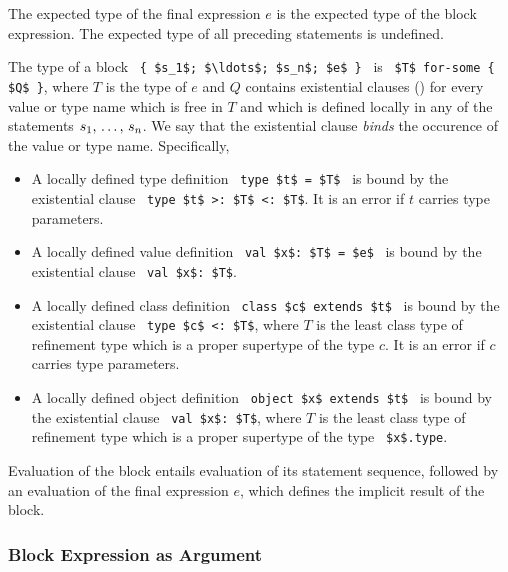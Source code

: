 The expected type of the final expression $e$ is the expected type of the block expression. The expected type of all preceding statements is undefined. 

The type of a block ~\lstinline!{ $s_1$; $\ldots$; $s_n$; $e$ }!~ is ~\lstinline!$T$ for-some { $Q$ }!, where $T$ is the type of $e$ and $Q$ contains existential clauses () for every value or type name which is free in $T$ and which is defined locally in any of the statements $s_1 ,\, \ldots ,\, s_n$. We say that the existential clause {\em binds} the occurence of the value or type name. Specifically, 
\begin{itemize}


\item A locally defined type definition ~\lstinline!type $t$ = $T$!~ is bound by the existential clause ~\lstinline!type $t$ >: $T$ <: $T$!. It is an error if $t$ carries type parameters. 

\item A locally defined value definition ~\lstinline!val $x$: $T$ = $e$!~ is bound by the existential clause ~\lstinline!val $x$: $T$!. 

\item A locally defined class definition ~\lstinline!class $c$ extends $t$!~ is bound by the existential clause ~\lstinline!type $c$ <: $T$!, where $T$ is the least class type of refinement type which is a proper supertype of the type $c$. It is an error if $c$ carries type parameters. 

\item A locally defined object definition ~\lstinline!object $x$ extends $t$!~ is bound by the existential clause ~\lstinline!val $x$: $T$!, where $T$ is the least class type of refinement type which is a proper supertype of the type ~\lstinline!$x$.type!.
\end{itemize}

Evaluation of the block entails evaluation of its statement sequence, followed by an evaluation of the final expression $e$, which defines the implicit result of the block. 





\subsubsection{Block Expression as Argument}
\label{sec:block-arguments}

